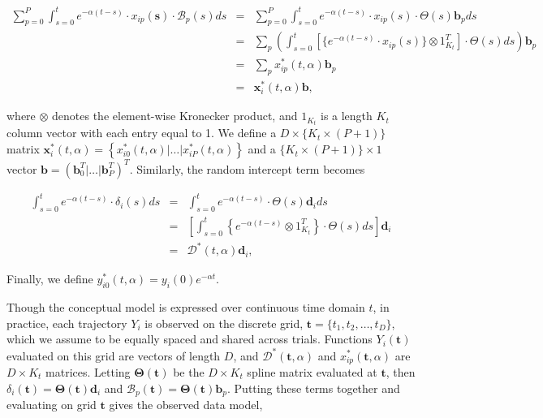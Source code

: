 \documentclass[preprint]{JASA}
\begin{document}
\begin{eqnarray*}
\sum_{p=0}^P \int_{s=0}^t e^{-\alpha (t-s)} \cdot x_{ip}(\mathbf{s}) \cdot \mathcal{B}_p(s) ds &=&\sum_{p=0}^P \int_{s=0}^t e^{-\alpha (t-s)} \cdot x_{ip}(s) \cdot  \Theta(s)\mathbf{b}_p ds \\[5mm]
&=& \sum_p \left(\int_{s=0}^t \left[\{e^{-\alpha (t-s)}\cdot x_{ip}(s)\}\otimes 1^T_{K_t}\right] \cdot \Theta(s) ds\right)\mathbf{b}_p \\[5mm]
&=& \sum_px_{ip}^*(t, \alpha)\mathbf{b}_p\\
&=& \mathbf{x}_i^*(t, \alpha)\mathbf{b},
\end{eqnarray*}

\noindent where \(\otimes\) denotes the element-wise Kronecker product,
and \(1_{K_t}\) is a length \(K_t\) column vector with each entry equal
to 1. We define a \(D \times \{K_t \times (P + 1)\}\) matrix
\(\mathbf{x}_i^*(t, \alpha) = \left\{x_{i0}^*(t, \alpha) | \ldots | x_{iP}^*(t, \alpha) \right\}\)
and a \(\{K_t \times (P + 1)\} \times 1\) vector
\(\mathbf{b} = \left(\mathbf{b}_0^T | \ldots | \mathbf{b}_P^T \right)^T.\)
Similarly, the random intercept term becomes

\begin{eqnarray*}
 \int_{s=0}^t e^{-\alpha (t-s)} \cdot \delta_i(s)ds &=&   \int_{s = 0}^t e^{-\alpha (t-s)} \cdot \Theta(s)\mathbf{d}_i ds\\[5mm]
&=&  \left[\int_{s = 0}^t \left\{ e^{-\alpha (t-s)}\otimes 1^T_{K_t} \right \}\cdot \Theta(s) ds\right] \mathbf{d}_i  \\[5mm]
&=& \mathcal{D}^*(t, \alpha)\mathbf{d}_i,
\end{eqnarray*}

\noindent Finally, we define
\(y_{i0}^*(t, \alpha) = y_i(0)e^{-\alpha t}\).

Though the conceptual model is expressed over continuous time domain
\(t\), in practice, each trajectory \(Y_i\) is observed on the discrete
grid, \(\mathbf{t} = \{t_1, t_2, \ldots, t_D\}\), which we assume to be
equally spaced and shared across trials. Functions \(Y_i(\mathbf{t})\)
evaluated on this grid are vectors of length \(D\), and
\(\mathcal{D}^*(\mathbf{t}, \alpha)\) and
\(x_{ip}^*(\mathbf{t}, \alpha)\) are \(D \times K_t\) matrices. Letting
\(\mathbf{\Theta}(\mathbf{t})\) be the \(D \times K_t\) spline matrix
evaluated at \(\mathbf{t}\), then
\(\delta_i(\mathbf{t}) = \mathbf{\Theta}(\mathbf{t})\mathbf{d}_i\) and
\(\mathcal{B}_p(\mathbf{t}) = \mathbf{\Theta}(\mathbf{t})\mathbf{b}_p\).
Putting these terms together and evaluating on grid \(\mathbf{t}\) gives
the observed data model,
\end{document}
